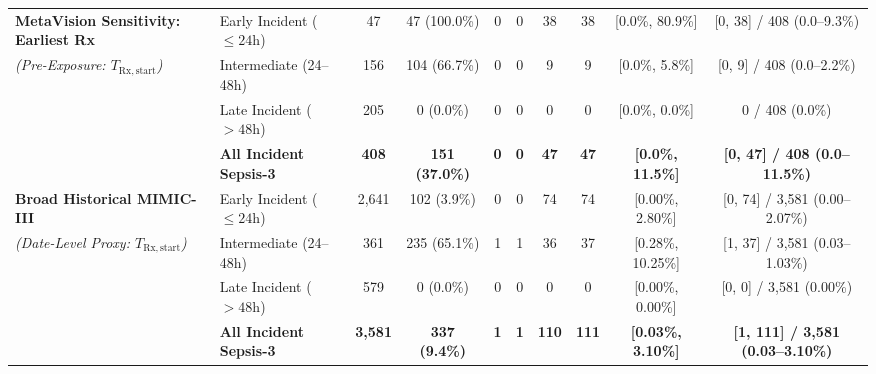 \documentclass[12pt,a4paper]{article}
\begin{document}
\begin{landscape}
\begin{table}[p]
\begin{singlespace}
\begin{tabular*}{\linewidth}{@{\extracolsep{\fill}}llcccccccc}
\midrule
\textbf{MetaVision Sensitivity: Earliest Rx} & Early Incident ($\le 24\text{h}$) & 47 & 47 (100.0\%) & 0 & 0 & 38 & 38 & [0.0\%, 80.9\%] & [0, 38] / 408 (0.0--9.3\%) \\
\textit{(Pre-Exposure: $T_{\mathrm{Rx,start}}$)} & Intermediate (24--48h) & 156 & 104 (66.7\%) & 0 & 0 & 9 & 9 & [0.0\%, 5.8\%] & [0, 9] / 408 (0.0--2.2\%) \\
 & Late Incident ($>48\text{h}$) & 205 & 0 (0.0\%) & 0 & 0 & 0 & 0 & [0.0\%, 0.0\%] & 0 / 408 (0.0\%) \\
 & \textbf{All Incident Sepsis-3} & \textbf{408} & \textbf{151 (37.0\%)} & \textbf{0} & \textbf{0} & \textbf{47} & \textbf{47} & \textbf{[0.0\%, 11.5\%]} & \textbf{[0, 47] / 408 (0.0--11.5\%)} \\
\midrule
\textbf{Broad Historical MIMIC-III} & Early Incident ($\le 24\text{h}$) & 2,641 & 102 (3.9\%) & 0 & 0 & 74 & 74 & [0.00\%, 2.80\%] & [0, 74] / 3,581 (0.00--2.07\%) \\
\textit{(Date-Level Proxy: $T_{\mathrm{Rx,start}}$)} & Intermediate (24--48h) & 361 & 235 (65.1\%) & 1 & 1 & 36 & 37 & [0.28\%, 10.25\%] & [1, 37] / 3,581 (0.03--1.03\%) \\
 & Late Incident ($>48\text{h}$) & 579 & 0 (0.0\%) & 0 & 0 & 0 & 0 & [0.00\%, 0.00\%] & [0, 0] / 3,581 (0.00\%) \\
 & \textbf{All Incident Sepsis-3} & \textbf{3,581} & \textbf{337 (9.4\%)} & \textbf{1} & \textbf{1} & \textbf{110} & \textbf{111} & \textbf{[0.03\%, 3.10\%]} & \textbf{[1, 111] / 3,581 (0.03--3.10\%)} \\
\bottomrule
\end{tabular*}
\end{singlespace}
\end{table}
\end{landscape}
\end{document}

